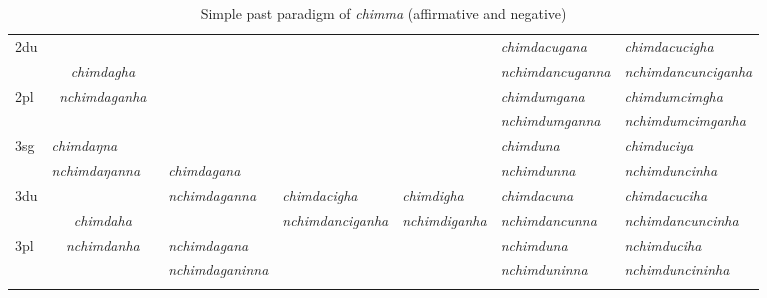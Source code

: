 \begin{landscape}
\begin{table}[p]
{\begin{tabular}{l|p{2.4cm}|p{2.0cm}|p{2.6cm}|p{2.6cm}|p{2.6cm}|p{3.2cm}|p{3.2cm}}
 \cline{1-2} \cline{7-8}			
{\sc 2du}		& \multicolumn{2}{c|}{}     &  \multicolumn{3}{c|}{\cellcolor[gray]{.8}} & \it  chimdacugana  & \it   chimdacucigha \\
		&  	\multicolumn{2}{c|}{\it chimdagha} & \multicolumn{3}{c|}{ \cellcolor[gray]{.8}}& \it nchimdancuganna  & \it  nchimdancunciganha \\
 \cline{1-1} \cline{7-8}			
{\sc 2pl}		& 	\multicolumn{2}{c|}{\it nchimdaganha} &  \multicolumn{3}{c|}{ \cellcolor[gray]{.8}}& \it  chimdumgana& \it  chimdumcimgha  \\
		& \multicolumn{2}{c|}{ }&  \multicolumn{3}{c|}{\cellcolor[gray]{.8} }& \it  nchimdumganna & \it  nchimdumcimganha \\
\hline			
{\sc 3sg} 		& \it chimdaŋna	  & \it 	      	& \it   			& \it     & \it     	& \it chimduna& \it chimduciya\\
		& \it  nchimdaŋanna   & \it    	& \it  chimdagana	& \it   & \it    & \it nchimdunna& \it nchimduncinha\\
  \cline{1-2}  \cline{7-8}					
{\sc 3du}&   \multicolumn{2}{c|}{}& \it nchimdaganna& \it  chimdacigha& \it chimdigha& \it   chimdacuna & \it   chimdacuciha\\
	& \multicolumn{2}{c|}{\it chimdaha}& \it  & \it nchimdanciganha& \it  nchimdiganha & \it  nchimdancunna & \it  nchimdancuncinha\\
 \cline{1-1} \cline{4-4} \cline{7-8}	
{\sc 3pl} &  \multicolumn{2}{c|}{\it nchimdanha}	& \it nchimdagana& \it  & \it  & \it nchimduna& \it nchimduciha\\	
	& \multicolumn{2}{c|}{ }& \it nchimdaganinna& \it & \it  & \it nchimduninna& \it nchimduncininha \\
\lspbottomrule
\end{tabular}
}
\caption{Simple past paradigm of \emph{chimma}  (affirmative and negative)}\label{par-chimd-pst}
\end{table}




\end{landscape}

